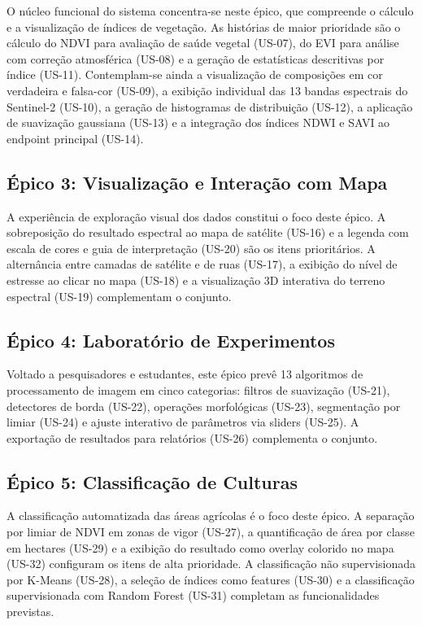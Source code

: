 \documentclass[12pt, a4paper]{article}
\begin{document}
O núcleo funcional do sistema concentra-se neste épico, que compreende o cálculo e a visualização de índices de vegetação. As histórias de maior prioridade são o cálculo do NDVI para avaliação de saúde vegetal (US-07), do EVI para análise com correção atmosférica (US-08) e a geração de estatísticas descritivas por índice (US-11). Contemplam-se ainda a visualização de composições em cor verdadeira e falsa-cor (US-09), a exibição individual das 13 bandas espectrais do Sentinel-2 (US-10), a geração de histogramas de distribuição (US-12), a aplicação de suavização gaussiana (US-13) e a integração dos índices NDWI e SAVI ao endpoint principal (US-14).

\subsection{Épico 3: Visualização e Interação com Mapa}

A experiência de exploração visual dos dados constitui o foco deste épico. A sobreposição do resultado espectral ao mapa de satélite (US-16) e a legenda com escala de cores e guia de interpretação (US-20) são os itens prioritários. A alternância entre camadas de satélite e de ruas (US-17), a exibição do nível de estresse ao clicar no mapa (US-18) e a visualização 3D interativa do terreno espectral (US-19) complementam o conjunto.

\subsection{Épico 4: Laboratório de Experimentos}

Voltado a pesquisadores e estudantes, este épico prevê 13 algoritmos de processamento de imagem em cinco categorias: filtros de suavização (US-21), detectores de borda (US-22), operações morfológicas (US-23), segmentação por limiar (US-24) e ajuste interativo de parâmetros via sliders (US-25). A exportação de resultados para relatórios (US-26) complementa o conjunto.

\subsection{Épico 5: Classificação de Culturas}

A classificação automatizada das áreas agrícolas é o foco deste épico. A separação por limiar de NDVI em zonas de vigor (US-27), a quantificação de área por classe em hectares (US-29) e a exibição do resultado como overlay colorido no mapa (US-32) configuram os itens de alta prioridade. A classificação não supervisionada por K-Means (US-28), a seleção de índices como features (US-30) e a classificação supervisionada com Random Forest (US-31) completam as funcionalidades previstas.
\end{document}

